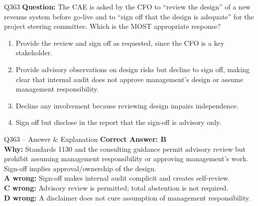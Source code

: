 \documentclass[aspectratio=169,10pt]{beamer}
\begin{document}
	\begin{frame}[t]{Q363}
		\small
		\textbf{Question:} The CAE is asked by the CFO to ``review the design'' of a new revenue system before go-live and to ``sign off that the design is adequate'' for the project steering committee. Which is the MOST appropriate response?
		\begin{enumerate}[label=\Alph*.,itemsep=1pt,topsep=2pt]
			\item Provide the review and sign off as requested, since the CFO is a key stakeholder.
			\item Provide advisory observations on design risks but decline to sign off, making clear that internal audit does not approve management's design or assume management responsibility.
			\item Decline any involvement because reviewing design impairs independence.
			\item Sign off but disclose in the report that the sign-off is advisory only.
		\end{enumerate}
	\end{frame}
	
	\begin{frame}[t]{Q363 -- Answer \& Explanation}
		\small
		\textbf{Correct Answer: B} \\[4pt]
		\textbf{Why:} Standards 1130 and the consulting guidance permit advisory review but prohibit assuming management responsibility or approving management's work. Sign-off implies approval/ownership of the design. \\[4pt]
		\textbf{A wrong:} Sign-off makes internal audit complicit and creates self-review. \\[2pt]
		\textbf{C wrong:} Advisory review is permitted; total abstention is not required. \\[2pt]
		\textbf{D wrong:} A disclaimer does not cure assumption of management responsibility.
	\end{frame}
	
\end{document}
